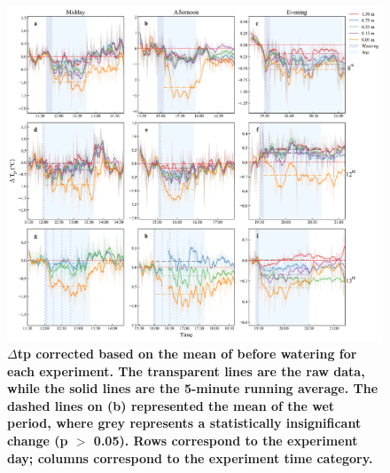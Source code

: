 \documentclass[final,3p,times,authoryear]{elsarticle}
\begin{document}

\begin{figure}
\centering
\includegraphics[trim={0 0 0 0},clip,scale=1.0]{pict043.png}
\caption{\bf $\Delta$\gls{tp} corrected based on the mean of before watering for each experiment. The transparent lines are the raw data, while the solid lines are the 5-minute running average. The dashed lines on (b) represented the mean of the wet period, where grey represents a statistically insignificant change (\gls{p} $>$ 0.05). Rows correspond to the experiment day; columns correspond to the experiment time category.}
 \label{fig:7.14}
\end{figure}


\end{document}
